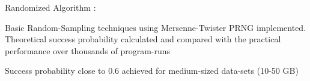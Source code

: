 \documentclass[letterpaper]{Formatting}
\begin{document}
\begin{minipage}[t]{0.66\textwidth}
\small Randomized Algorithm :\vspace{0.5ex}
\vspace{\topsep} %
\footnotesize{
\begin{tightitemize}
\item Basic Random-Sampling techniques using Mersenne-Twister PRNG implemented. Theoretical success probability calculated and compared with the practical performance over thousands of program-runs
\item Success probability close to 0.6 achieved for medium-sized data-sets (10-50 GB)
\end{tightitemize}
}
\sectionspace %
\vspace{2ex}


\end{minipage}
\end{document}
